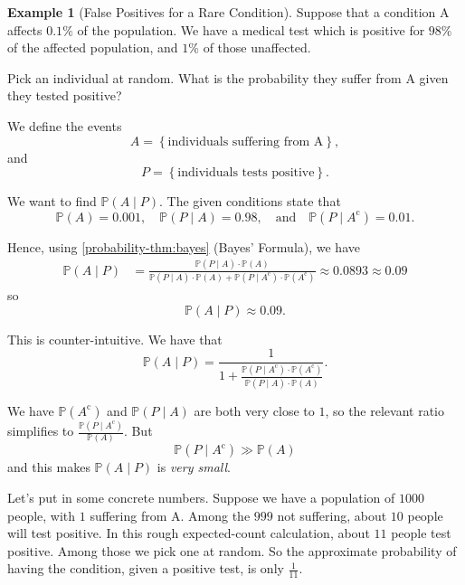 \documentclass[11pt]{article}
\numberwithin{equation}{section}
\theoremstyle{definition}
\newtheorem{example}[theorem]{Example}
\theoremstyle{remark}
\newcommand{\pqty}[1]{\left(#1\right)}
\newcommand{\Bqty}[1]{\left\{#1\right\}}
\newcommand{\qand}{\quad\text{and}\quad}
\newcommand{\compl}{^{\mathrm c}}
\newcommand{\Prob}{\mathbb P}
\newcommand{\Conditional}[2]{#1\mid #2}
\begin{document}
\begin{example}[False Positives for a Rare Condition]\label{probability-example-010}
    \label{probability-ex:false-positives}%
    Suppose that a condition A affects \(0.1\%\) of the population. We have a medical test which is positive for \(98\%\) of the affected population, and \(1\%\) of those unaffected.

    Pick an individual at random. What is the probability they suffer from A given they tested positive?

    We define the events
    \[
        A = \Bqty{\text{individuals suffering from A}},
    \]
    and
    \[
        P = \Bqty{\text{individuals tests positive}}.
    \]

    We want to find \(\Prob\pqty{\Conditional{A}{P}}\). The given conditions state that
    \[
        \Prob\pqty{A} = 0.001, \quad \Prob\pqty{\Conditional{P}{A}} = 0.98, \qand \Prob\pqty{\Conditional{P}{A\compl}} = 0.01.
    \]

    Hence, using \autoref{probability-thm:bayes} (Bayes' Formula), we have
    \begin{align*}
        \Prob\pqty{\Conditional{A}{P}} &= \frac{\Prob\pqty{\Conditional{P}{A}} \cdot \Prob\pqty{A}}{\Prob\pqty{\Conditional{P}{A}} \cdot \Prob\pqty{A} + \Prob\pqty{\Conditional{P}{A\compl}} \cdot \Prob\pqty{A\compl}} \approx 0.0893 \approx 0.09
    \end{align*}
    so
    \[
        \Prob\pqty{\Conditional{A}{P}} \approx 0.09.
    \]

    This is counter-intuitive. We have that
    \[
        \Prob\pqty{\Conditional{A}{P}} = \frac{1}{1 + \frac{\Prob\pqty{\Conditional{P}{A\compl}} \cdot \Prob\pqty{A\compl}}{\Prob\pqty{\Conditional{P}{A}} \cdot \Prob\pqty{A}}}.
    \]

    We have \(\Prob\pqty{A\compl}\) and \(\Prob\pqty{\Conditional{P}{A}}\) are both very close to \(1\), so the relevant ratio simplifies to \(\frac{\Prob\pqty{\Conditional{P}{A\compl}}}{\Prob\pqty{A}}\). But
    \[
        \Prob\pqty{\Conditional{P}{A\compl}} \gg \Prob\pqty{A}
    \]
    and this makes \(\Prob\pqty{\Conditional{A}{P}}\) is \emph{very small}.

    Let's put in some concrete numbers. Suppose we have a population of \(1000\) people, with \(1\) suffering from A. Among the \(999\) not suffering, about \(10\) people will test positive. In this rough expected-count calculation, about \(11\) people test positive. Among those we pick one at random. So the approximate probability of having the condition, given a positive test, is only \(\frac{1}{11}\).
\end{example}
\end{document}
